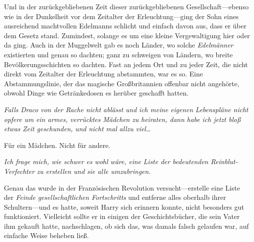 Und in der zurückgebliebenen Zeit dieser zurückgebliebenen Gesellschaft—ebenso wie in der Dunkelheit vor dem Zeitalter der Erleuchtung—ging der Sohn eines ausreichend machtvollen Edelmanns schlicht und einfach davon aus, dass er über dem Gesetz stand. Zumindest, solange es um eine kleine Vergewaltigung hier oder da ging. Auch in der Muggelwelt gab es noch Länder, wo solche \emph{Edelmänner} existierten und genau so dachten; ganz zu schweigen von Ländern, wo breite Bevölkerungsschichten so dachten. Fast an jedem Ort und zu jeder Zeit, die nicht direkt vom Zeitalter der Erleuchtung abstammten, war es so. Eine Abstammungslinie, der das magische Großbritannien offenbar nicht angehörte, obwohl Dinge wie Getränkedosen es herüber geschafft hatten.

\emph{Falls Draco von der Rache nicht ablässt und ich meine eigenen Lebenspläne nicht opfere um ein armes, verrücktes Mädchen zu heiraten, dann habe ich jetzt bloß etwas Zeit geschunden, und nicht mal allzu viel…}

Für ein Mädchen. Nicht für andere.

\emph{Ich frage mich, wie schwer es wohl wäre, eine Liste der bedeutenden Reinblut-Verfechter zu erstellen und sie alle umzubringen.}

Genau das wurde in der Französischen Revolution versucht—erstelle eine Liste der \emph{Feinde gesellschaftlichen Fortschritts} und entferne alles oberhalb ihrer Schultern—und es hatte, soweit Harry sich erinnern konnte, nicht besonders gut funktioniert. Vielleicht sollte er in einigen der Geschichtsbücher, die sein Vater ihm gekauft hatte, nachschlagen, ob sich das, was damals falsch gelaufen war, auf einfache Weise beheben ließ.

